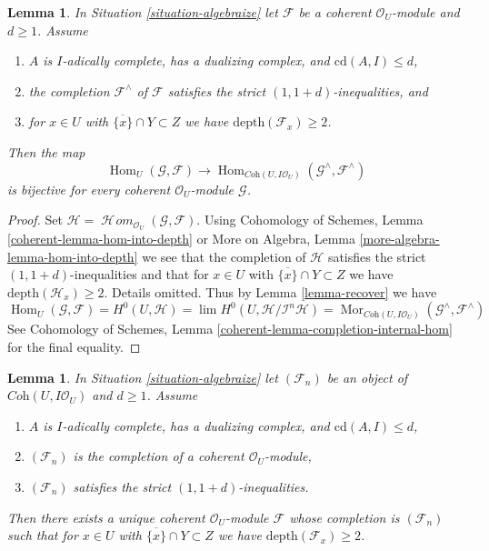 \documentclass{stacks-project}
\theoremstyle{plain}
\newtheorem{lemma}[subsection]{Lemma}
\theoremstyle{definition}
\theoremstyle{remark}
\numberwithin{equation}{subsection}
\def\lim{\mathop{\mathrm{lim}}\nolimits}
\def\Hom{\mathop{\mathrm{Hom}}\nolimits}
\def\SheafHom{\mathop{\mathcal{H}\!\mathit{om}}\nolimits}
\def\Mor{\mathop{\mathrm{Mor}}\nolimits}
\begin{document}
\begin{lemma}
\label{lemma-fully-faithful-inequalities}
In Situation \ref{situation-algebraize} let $\mathcal{F}$ be a
coherent $\mathcal{O}_U$-module and $d \geq 1$. Assume
\begin{enumerate}
\item $A$ is $I$-adically complete, has a dualizing complex, and
$\text{cd}(A, I) \leq d$,
\item the completion $\mathcal{F}^\wedge$ of $\mathcal{F}$
satisfies the strict $(1, 1 + d)$-inequalities, and
\item for $x \in U$ with $\overline{\{x\}} \cap Y \subset Z$
we have $\text{depth}(\mathcal{F}_x) \geq 2$.
\end{enumerate}
Then the map
$$
\Hom_U(\mathcal{G}, \mathcal{F})
\longrightarrow
\Hom_{\textit{Coh}(U, I\mathcal{O}_U)}(\mathcal{G}^\wedge, \mathcal{F}^\wedge)
$$
is bijective for every coherent $\mathcal{O}_U$-module $\mathcal{G}$. 
\end{lemma}

\begin{proof}
Set $\mathcal{H} = \SheafHom_{\mathcal{O}_U}(\mathcal{G}, \mathcal{F})$.
Using Cohomology of Schemes, Lemma
\ref{coherent-lemma-hom-into-depth} or
More on Algebra, Lemma \ref{more-algebra-lemma-hom-into-depth}
we see that the completion of $\mathcal{H}$
satisfies the strict $(1, 1 + d)$-inequalities and that for
$x \in U$ with $\overline{\{x\}} \cap Y \subset Z$
we have $\text{depth}(\mathcal{H}_x) \geq 2$. Details omitted.
Thus by Lemma \ref{lemma-recover} we have
$$
\Hom_U(\mathcal{G}, \mathcal{F}) =
H^0(U, \mathcal{H}) =
\lim H^0(U, \mathcal{H}/\mathcal{I}^n\mathcal{H}) =
\Mor_{\textit{Coh}(U, I\mathcal{O}_U)}
(\mathcal{G}^\wedge, \mathcal{F}^\wedge)
$$
See Cohomology of Schemes, Lemma \ref{coherent-lemma-completion-internal-hom}
for the final equality.
\end{proof}

\begin{lemma}
\label{lemma-construct-unique}
In Situation \ref{situation-algebraize} let $(\mathcal{F}_n)$ be an
object of $\textit{Coh}(U, I\mathcal{O}_U)$ and $d \geq 1$. Assume
\begin{enumerate}
\item $A$ is $I$-adically complete, has a dualizing complex, and
$\text{cd}(A, I) \leq d$,
\item $(\mathcal{F}_n)$ is the completion of a coherent $\mathcal{O}_U$-module,
\item $(\mathcal{F}_n)$ satisfies the strict $(1, 1 + d)$-inequalities.
\end{enumerate}
Then there exists a unique coherent $\mathcal{O}_U$-module $\mathcal{F}$
whose completion is $(\mathcal{F}_n)$ such that for
$x \in U$ with $\overline{\{x\}} \cap Y \subset Z$
we have $\text{depth}(\mathcal{F}_x) \geq 2$.
\end{lemma}
\end{document}
